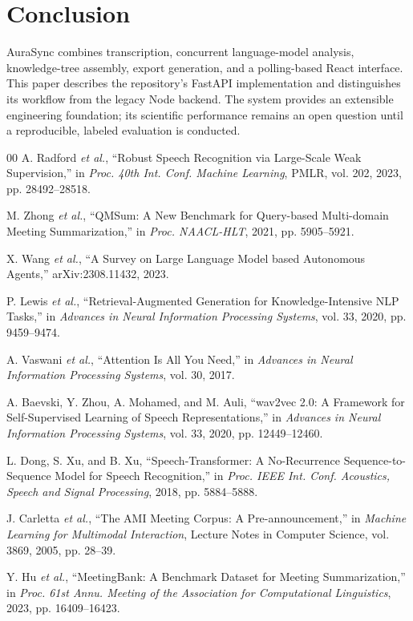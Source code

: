 \documentclass[conference]{IEEEtran}
\begin{document}
\section{Conclusion}
AuraSync combines transcription, concurrent language-model analysis, knowledge-tree assembly, export generation, and a polling-based React interface. This paper describes the repository's FastAPI implementation and distinguishes its workflow from the legacy Node backend. The system provides an extensible engineering foundation; its scientific performance remains an open question until a reproducible, labeled evaluation is conducted.

\begin{thebibliography}{00}
A. Radford \emph{et al.}, ``Robust Speech Recognition via Large-Scale Weak Supervision,'' in \emph{Proc. 40th Int. Conf. Machine Learning}, PMLR, vol. 202, 2023, pp. 28492--28518.

M. Zhong \emph{et al.}, ``QMSum: A New Benchmark for Query-based Multi-domain Meeting Summarization,'' in \emph{Proc. NAACL-HLT}, 2021, pp. 5905--5921.

X. Wang \emph{et al.}, ``A Survey on Large Language Model based Autonomous Agents,'' arXiv:2308.11432, 2023.

P. Lewis \emph{et al.}, ``Retrieval-Augmented Generation for Knowledge-Intensive NLP Tasks,'' in \emph{Advances in Neural Information Processing Systems}, vol. 33, 2020, pp. 9459--9474.

A. Vaswani \emph{et al.}, ``Attention Is All You Need,'' in \emph{Advances in Neural Information Processing Systems}, vol. 30, 2017.

A. Baevski, Y. Zhou, A. Mohamed, and M. Auli, ``wav2vec 2.0: A Framework for Self-Supervised Learning of Speech Representations,'' in \emph{Advances in Neural Information Processing Systems}, vol. 33, 2020, pp. 12449--12460.

L. Dong, S. Xu, and B. Xu, ``Speech-Transformer: A No-Recurrence Sequence-to-Sequence Model for Speech Recognition,'' in \emph{Proc. IEEE Int. Conf. Acoustics, Speech and Signal Processing}, 2018, pp. 5884--5888.

J. Carletta \emph{et al.}, ``The AMI Meeting Corpus: A Pre-announcement,'' in \emph{Machine Learning for Multimodal Interaction}, Lecture Notes in Computer Science, vol. 3869, 2005, pp. 28--39.

Y. Hu \emph{et al.}, ``MeetingBank: A Benchmark Dataset for Meeting Summarization,'' in \emph{Proc. 61st Annu. Meeting of the Association for Computational Linguistics}, 2023, pp. 16409--16423.


\end{thebibliography}
\end{document}
